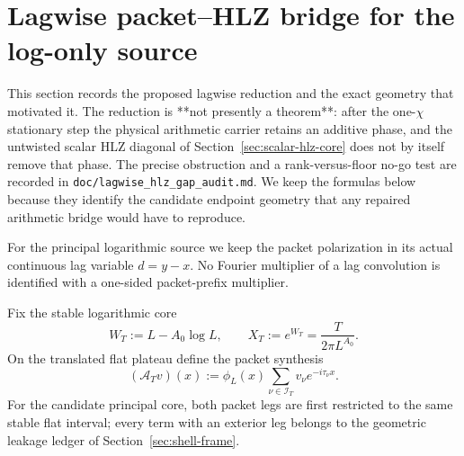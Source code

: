 \section{Lagwise packet--HLZ bridge for the log-only source}
\label{sec:lagwise-packet-hlz}

This section records the proposed lagwise reduction and the exact geometry that
motivated it.  The reduction is **not presently a theorem**: after the
one-$\chi$ stationary step the physical arithmetic carrier retains an additive
phase, and the untwisted scalar HLZ diagonal of
Section~\ref{sec:scalar-hlz-core} does not by itself remove that phase.  The
precise obstruction and a rank-versus-floor no-go test are recorded in
\texttt{doc/lagwise\_hlz\_gap\_audit.md}.  We keep the formulas below because
they identify the candidate endpoint geometry that any repaired arithmetic
bridge would have to reproduce.

For the principal logarithmic source we keep the packet polarization in its
actual continuous lag variable $d=y-x$.  No Fourier multiplier of a lag
convolution is identified with a one-sided packet-prefix multiplier.

Fix the stable logarithmic core
\begin{equation}
\boxed{
W_T:=L-A_0\log L,
\qquad
X_T:=e^{W_T}=\frac{T}{2\pi L^{A_0}}.
}
\label{eq:stable-log-core-main}
\end{equation}
On the translated flat plateau define the packet synthesis
\begin{equation}
\boxed{
(\mathcal A_Tv)(x):=\phi_L(x)
\sum_{\nu\in\mathcal I_T}v_\nu e^{-i\tau_\nu x}.
}
\label{eq:lagwise-packet-analysis}
\end{equation}
For the candidate principal core, both packet legs are first restricted to the
same stable flat interval; every term with an exterior leg belongs to the
geometric leakage ledger of Section~\ref{sec:shell-frame}.

